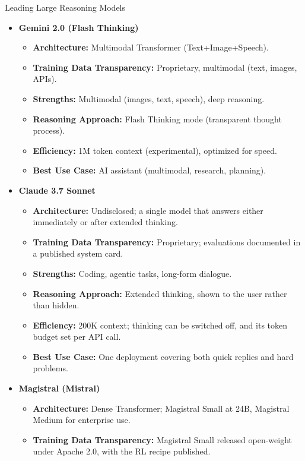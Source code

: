 \begin{frame}[allowframebreaks]{Leading Large Reasoning Models}
\begin{itemize}
\begin{itemize}
        \end{itemize}
    \framebreak
        \item \textbf{Gemini 2.0 (Flash Thinking)}
        \begin{itemize}
            \item \textbf{Architecture:} Multimodal Transformer (Text+Image+Speech).
            \item \textbf{Training Data Transparency:} Proprietary, multimodal (text, images, APIs).
            \item \textbf{Strengths:} Multimodal (images, text, speech), deep reasoning.
            \item \textbf{Reasoning Approach:} Flash Thinking mode (transparent thought process).
            \item \textbf{Efficiency:} 1M token context (experimental), optimized for speed.
            \item \textbf{Best Use Case:} AI assistant (multimodal, research, planning).
        \end{itemize}
    \framebreak
        \item \textbf{Claude 3.7 Sonnet}
        \begin{itemize}
            \item \textbf{Architecture:} Undisclosed; a single model that answers either immediately or after extended thinking.
            \item \textbf{Training Data Transparency:} Proprietary; evaluations documented in a published system card.
            \item \textbf{Strengths:} Coding, agentic tasks, long-form dialogue.
            \item \textbf{Reasoning Approach:} Extended thinking, shown to the user rather than hidden.
            \item \textbf{Efficiency:} 200K context; thinking can be switched off, and its token budget set per API call.
            \item \textbf{Best Use Case:} One deployment covering both quick replies and hard problems.
        \end{itemize}
    \framebreak
        \item \textbf{Magistral (Mistral)}
        \begin{itemize}
            \item \textbf{Architecture:} Dense Transformer; Magistral Small at 24B, Magistral Medium for enterprise use.
            \item \textbf{Training Data Transparency:} Magistral Small released open-weight under Apache 2.0, with the RL recipe published.

\end{itemize}
\end{itemize}
\end{frame}
